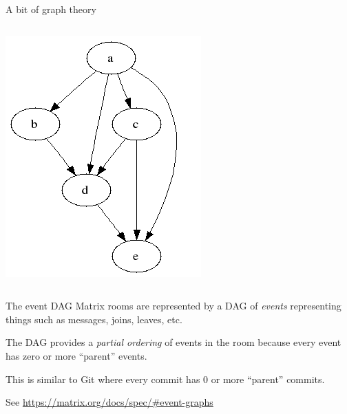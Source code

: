 \documentclass{acm}
\begin{document}
\begin{frame}{A bit of graph theory}
\begin{columns}
\begin{column}{0.4\textwidth}
{            \includegraphics[width=\textwidth]{graphics/dag}
        }
    \end{column}
    \end{columns}
\end{frame}

\begin{frame}{The event DAG}
    Matrix rooms are represented by a DAG of \textit{events} representing things
    such as messages, joins, leaves, etc.
    \pause

    The DAG provides a \textit{partial ordering} of events in the room because
    every event has zero or more ``parent'' events.
    \pause

    This is similar to Git where every commit has 0 or more ``parent'' commits.

    \vspace{1cm}
    {
        \tiny
        See \url{https://matrix.org/docs/spec/\#event-graphs}
    }
\end{frame}
\end{document}
